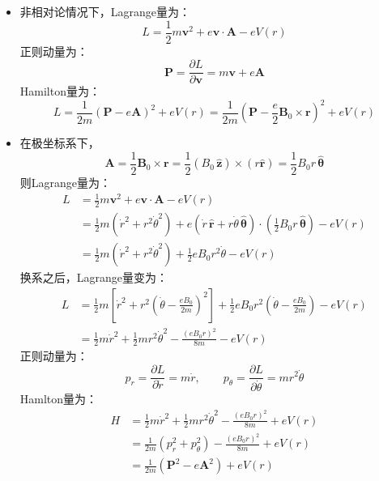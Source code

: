 \documentclass[a4paper,fontset=windows]{ctexart}
\begin{document}
\begin{itemize}
        \item[6.5.(1)]
        非相对论情况下，Lagrange量为：
        \[
        L = \frac{1}{2}m\bm{v}^2 + e\bm{v}\cdot\bm{A} -eV(r)
        \]
        正则动量为：
        \[
        \bm{P} = \frac{\partial L}{\partial\bm{v}} = m\bm{v} + e\bm{A}
        \]
        Hamilton量为：
        \[
        L = \frac{1}{2m}(\bm{P} - e\bm{A})^2 + eV(r) = \frac{1}{2m}\left(\bm{P} - \frac{e}{2}\bm{B}_0\times\bm{r}\right)^2 + eV(r)
        \]
        \medskip

        \item[6.5.(2)]
        在极坐标系下，
        \[
        \bm{A} = \frac{1}{2}\bm{B}_0\times\bm{r} = \frac{1}{2}(B_0\,\bm{\hat{z}})\times(r\bm{\hat{r}}) = \frac{1}{2}B_0 r \,\bm{\hat{\theta}}
        \]
        则Lagrange量为：
        \begin{align*}
            L
            &= \frac{1}{2}m\bm{v}^2 + e\bm{v}\cdot\bm{A} -eV(r) \\
            &= \frac{1}{2}m(\dot{r}^2 + r^2\dot{\theta}^2) + e(\dot{r}\,\bm{\hat{r}} + r\dot{\theta}\,\bm{\hat{\theta}}) \cdot \left(\frac{1}{2}B_0 r \,\bm{\hat{\theta}}\right) - eV(r) \\
            &= \frac{1}{2}m(\dot{r}^2 + r^2\dot{\theta}^2) + \frac{1}{2}eB_0 r^2\dot{\theta} - eV(r)
        \end{align*}
        换系之后，Lagrange量变为：
        \begin{align*}
            L
            &= \frac{1}{2}m\left[\dot{r}^2 + r^2\left(\dot{\theta} - \frac{eB_0}{2m}\right)^2\right] + \frac{1}{2}eB_0 r^2\left(\dot{\theta} - \frac{eB_0}{2m}\right) - eV(r) \\
            &= \frac{1}{2}m\dot{r}^2 + \frac{1}{2}mr^2\dot{\theta}^2 - \frac{(eB_0 r)^2}{8m} - eV(r)
        \end{align*}
        正则动量为：
        \[
        p_r = \frac{\partial L}{\partial\dot{r}} = m\dot{r},\qquad p_\theta = \frac{\partial L}{\partial\dot{\theta}} = mr^2\dot{\theta}
        \]
        Hamlton量为：
        \begin{align*}
            H
            &= \frac{1}{2}m\dot{r}^2 + \frac{1}{2}mr^2\dot{\theta}^2 - \frac{(eB_0 r)^2}{8m} + eV(r) \\
            &= \frac{1}{2m}(p_r^2 + p_\theta^2) - \frac{(eB_0 r)^2}{8m} + eV(r) \\
            &= \frac{1}{2m}(\bm{P}^2 - e\bm{A}^2) + eV(r)
        \end{align*}
        \bigskip


\end{itemize}
\end{document}
